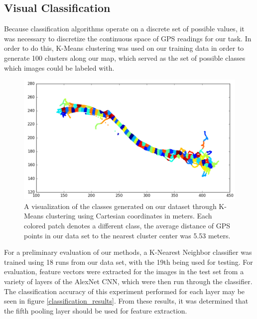 \documentclass[letterpaper, 12 pt, conference]{ieeeconf}  %
\begin{document}
\subsection{Visual Classification}

Because classification algorithms operate on a discrete set of possible values, it was necessary to discretize the continuous space of GPS readings for our task. In order to do this, K-Means clustering \cite{alsabti1997efficient} was used on our training data in order to generate 100 clusters along our map, which served as the set of possible classes which images could be labeled with. 
\par 

\begin{figure}[h]
\centering
\includegraphics[scale=0.95]{clustering}
\caption{A visualization of the classes generated on our dataset through K-Means clustering using Cartesian coordinates in meters. Each colored patch denotes a different class, the average distance of GPS points in our data set to the nearest cluster center was 5.53 meters.}
\label{clustering}
\end{figure}

For a preliminary evaluation of our methods, a K-Nearest Neighbor classifier was trained using 18 runs from our data set, with the 19th being used for testing. For evaluation, feature vectors were extracted for the images in the test set from a variety of layers of the AlexNet CNN, which were then run through the classifier. The classification accuracy of this experiment performed for each layer may be seen in figure \ref{classification_results}. From these results, it was determined that the fifth pooling layer should be used for feature extraction.  
\end{document}

